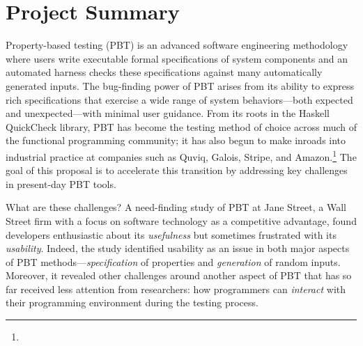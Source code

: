 \section*{Project Summary}


\newcommand{\summarysection}[1]{\medskip \noindent {\bf #1.} }

\summarysection{Overview}
Property-based testing (PBT) is an advanced software engineering
methodology where users write executable formal specifications of system
components
and an automated harness checks these specifications against
many automatically generated inputs.  The bug-finding power of PBT
arises from its ability to express rich specifications that
exercise a wide range of system behaviors---both
expected and unexpected---with minimal user guidance.
%
From its roots in the Haskell QuickCheck library, PBT has become
the testing method of choice across much of the functional programming
community; it has also begun to make inroads into industrial practice
at companies such as Quviq, Galois, Stripe, and
Amazon.\footnote{\iflater{}\fi}
%
The goal of this proposal is to accelerate this transition
by addressing key challenges in
present-day PBT tools.

What are these challenges?\iflater{}\fi
A need-finding study of PBT at Jane
Street, a Wall Street firm with a focus on software
technology as a competitive advantage, found developers enthusiastic
about its {\em usefulness} but
sometimes frustrated with its {\em usability}.
%
Indeed, the study identified usability as an issue in both major aspects
of PBT methods---{\em specification} of properties and {\em
  generation} of random inputs. Moreover, it revealed other challenges
around another aspect of PBT that has so far received less attention from
researchers: how programmers can {\em interact} with their programming
environment during the testing process.


